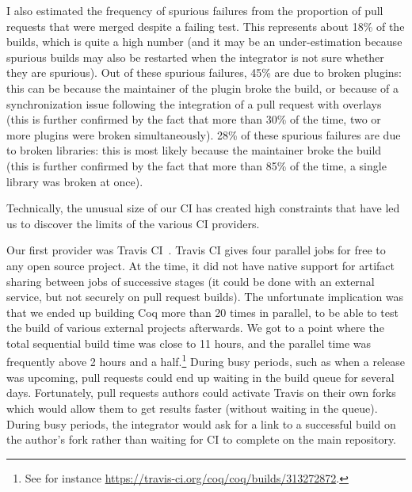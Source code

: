 I also estimated the frequency of spurious failures from the proportion of pull requests that were merged despite a failing test. This represents about 18\% of the builds, which is quite a high number (and it may be an under-estimation because spurious builds may also be restarted when the integrator is not sure whether they are spurious).
Out of these spurious failures, 45\% are due to broken plugins: this can be because the maintainer of the plugin broke the build, or because of a synchronization issue following the integration of a pull request with overlays (this is further confirmed by the fact that more than 30\% of the time, two or more plugins were broken simultaneously).
28\% of these spurious failures are due to broken libraries: this is most likely because the maintainer broke the build (this is further confirmed by the fact that more than 85\% of the time, a single library was broken at once).

Technically, the unusual size of our CI has created high constraints that have led us to discover the limits of the various CI providers.

Our first provider was Travis CI~\cite{travisci}.
Travis CI gives four parallel jobs for free to any open source project.
At the time, it did not have native support for artifact sharing between jobs of successive stages (it could be done with an external service, but not securely on pull request builds).
The unfortunate implication was that we ended up building Coq more than 20 times in parallel, to be able to test the build of various external projects afterwards.
We got to a point where the total sequential build time was close to 11 hours, and the parallel time was frequently above 2 hours and a half.\footnote{
	See for instance \url{https://travis-ci.org/coq/coq/builds/313272872}.
}
During busy periods, such as when a release was upcoming, pull requests could end up waiting in the build queue for several days.
Fortunately, pull requests authors could activate Travis on their own forks which would allow them to get results faster (without waiting in the queue).
During busy periods, the integrator would ask for a link to a successful build on the author's fork rather than waiting for CI to complete on the main repository.

